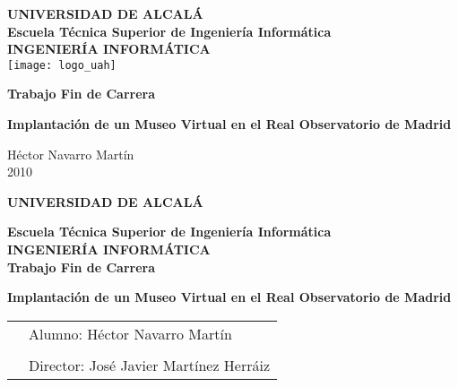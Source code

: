 \thispagestyle{empty}
\large
\vspace{3cm}
\begin{center}

{
\Large\textbf{UNIVERSIDAD DE ALCALÁ}}  \\
\vspace{1cm}
\textbf{Escuela Técnica Superior de Ingeniería Informática}\\

\vspace{1cm}
{\Large\textbf{INGENIERÍA INFORMÁTICA}}\\
\vspace{15mm}
\texttt{[image: logo\_uah]}
\vspace{1cm}

\textbf{Trabajo Fin de Carrera}\\
\vspace{2cm}

{\LARGE \textbf{Implantación de un Museo Virtual en el Real Observatorio de Madrid}}

\end{center}
\vspace{4cm}
\begin{flushright}
  Héctor Navarro Martín\\
  2010
\end{flushright}

\newpage
\clearemptydoublepage
\thispagestyle{empty}
\large
\begin{center}
{\Large\textbf{UNIVERSIDAD DE ALCALÁ}}  \\
\vspace{7mm}

\textbf{Escuela Técnica Superior de Ingeniería Informática}\\

\vspace{7mm}
{\Large\textbf{INGENIERÍA INFORMÁTICA}}\\
\vspace{2cm}
\textbf{Trabajo Fin de Carrera}\\
\vspace{2cm}

{\Large \textbf{Implantación de un Museo Virtual en el Real Observatorio de Madrid}}

\end{center}
\vspace{2cm}
\noindent
\begin{tabular}{p{5cm}l}
&Alumno: Héctor Navarro Martín\\
&\\
&Director: José Javier Martínez Herráiz
\end{tabular}

